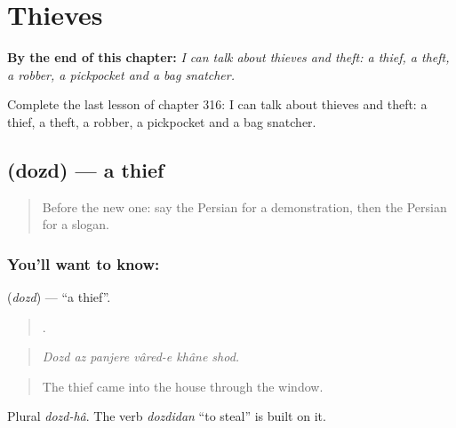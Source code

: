 
\chapter{Thieves}
\label{ch:fa-thieves}

\begin{chapteropening}
\textbf{By the end of this chapter:} \emph{I can talk about thieves and theft: a thief, a theft, a robber, a pickpocket and a bag snatcher.}

Complete the last lesson of chapter 316: I can talk about thieves and theft: a thief, a theft, a robber, a pickpocket and a bag snatcher.
\end{chapteropening}

\section[\texorpdfstring{\fa{دزد} (dozd)}{دزد (dozd)}]{ (dozd) — a thief}

\label{lesson:FA-C316-dozd}



\begin{quote}
Before the new one: say the Persian for a demonstration, then the Persian for a slogan.
\end{quote}

\subsection*{You'll want to know: }
\textbf{} (\emph{dozd}) — \textquotedblleft{}a thief\textquotedblright{}.

\begin{quote}
     .
\end{quote}

\begin{quote}
\emph{Dozd az panjere vâred-e khâne shod.}
\end{quote}

\begin{quote}
The thief came into the house through the window.
\end{quote}

Plural \emph{dozd-hâ}. The verb \emph{dozdidan} \textquotedblleft{}to steal\textquotedblright{} is built on it.

